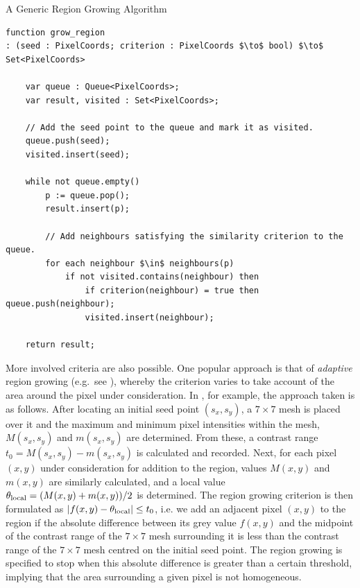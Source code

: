 \begin{stulisting}[p]
\caption{A Generic Region Growing Algorithm}
\label{code:background-segmentation-regiongrowing-generic}
\begin{lstlisting}[style=Default]
function grow_region
: (seed : PixelCoords; criterion : PixelCoords $\to$ bool) $\to$ Set<PixelCoords>

	var queue : Queue<PixelCoords>;
	var result, visited : Set<PixelCoords>;

	// Add the seed point to the queue and mark it as visited.
	queue.push(seed);
	visited.insert(seed);

	while not queue.empty()
		p := queue.pop();
		result.insert(p);

		// Add neighbours satisfying the similarity criterion to the queue.
		for each neighbour $\in$ neighbours(p)
			if not visited.contains(neighbour) then
				if criterion(neighbour) = true then queue.push(neighbour);
				visited.insert(neighbour);
			
	return result;
\end{lstlisting}
\end{stulisting}

More involved criteria are also possible. One popular approach is that of \emph{adaptive} region growing (e.g.~see \cite{lin06,pohle01}), whereby the criterion varies to take account of the area around the pixel under consideration. In \cite{lin06}, for example, the approach taken is as follows. After locating an initial seed point $(s_x, s_y)$, a $7 \times 7$ mesh is placed over it and the maximum and minimum pixel intensities within the mesh, $M(s_x, s_y)$ and $m(s_x, s_y)$ are determined. From these, a contrast range $t_0 = M(s_x, s_y) - m(s_x, s_y)$ is calculated and recorded. Next, for each pixel $(x,y)$ under consideration for addition to the region, values $M(x,y)$ and $m(x,y)$ are similarly calculated, and a local value $\theta_{\rm local} = (M(x,y) + m(x,y)) / 2$ is determined. The region growing criterion is then formulated as $|f(x,y) - \theta_{\rm local}| \le t_0$, i.e. we add an adjacent pixel $(x,y)$ to the region if the absolute difference between its grey value $f(x,y)$ and the midpoint of the contrast range of the $7 \times 7$ mesh surrounding it is less than the contrast range of the $7 \times 7$ mesh centred on the initial seed point. The region growing is specified to stop when this absolute difference is greater than a certain threshold, implying that the area surrounding a given pixel is not homogeneous.


